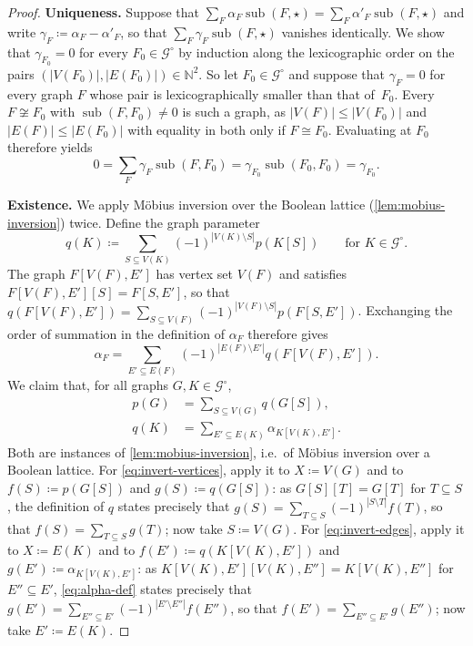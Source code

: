 \documentclass[11pt]{scrartcl}
\theoremstyle{definition}
\theoremstyle{plain}
\theoremstyle{remark}
\DeclareMathOperator{\sub}{sub}
\newcommand{\lG}{\mathcal{G}^\circ}
\begin{document}
	\begin{proof}


		\textbf{Uniqueness.}
		Suppose that $\sum_F \alpha_F \sub(F, \star) = \sum_F \alpha'_F \sub(F, \star)$
		and write $\gamma_F \coloneqq \alpha_F - \alpha'_F$,
		so that $\sum_F \gamma_F \sub(F, \star)$ vanishes identically.
		We show that $\gamma_{F_0} = 0$ for every $F_0 \in \lG$
		by induction along the lexicographic order on the pairs $(|V(F_0)|, |E(F_0)|) \in \mathbb{N}^2$.
		So let $F_0 \in \lG$ and suppose that $\gamma_F = 0$
		for every graph $F$ whose pair is lexicographically smaller than that of~$F_0$.
		Every $F \not\cong F_0$ with $\sub(F, F_0) \neq 0$ is such a graph,
		as $|V(F)| \leq |V(F_0)|$ and $|E(F)| \leq |E(F_0)|$ with equality in both only if $F \cong F_0$.
		Evaluating at $F_0$ therefore yields
		\[
			0 = \sum_F \gamma_F \sub(F, F_0) = \gamma_{F_0} \sub(F_0, F_0) = \gamma_{F_0}.
		\]
		

		\textbf{Existence.}
        We apply M\"obius inversion over the Boolean lattice (\cref{lem:mobius-inversion}) twice.
		Define the graph parameter
		\[
			q(K) \coloneqq \sum_{S \subseteq V(K)} (-1)^{|V(K) \setminus S|} p(K[S])
			\qquad \text{for } K \in \lG.
		\]
		The graph $F[V(F), E']$ has vertex set $V(F)$ and satisfies $F[V(F), E'][S] = F[S, E']$,
		so that $q(F[V(F), E']) = \sum_{S \subseteq V(F)} (-1)^{|V(F) \setminus S|} p(F[S, E'])$.
		Exchanging the order of summation in the definition of $\alpha_F$ therefore gives
		\begin{equation}\label{eq:alpha-def}
			\alpha_F = \sum_{E' \subseteq E(F)} (-1)^{|E(F) \setminus E'|} q(F[V(F), E']).
		\end{equation}
		We claim that, for all graphs $G, K \in \lG$,
		\begin{align}
			p(G) &= \sum_{S \subseteq V(G)} q(G[S]), \label{eq:invert-vertices}\\
			q(K) &= \sum_{E' \subseteq E(K)} \alpha_{K[V(K), E']}. \label{eq:invert-edges}
		\end{align}
		Both are instances of \cref{lem:mobius-inversion}, i.e.\ of Möbius inversion over a Boolean lattice.
		For \eqref{eq:invert-vertices}, apply it to $X \coloneqq V(G)$
		and to $f(S) \coloneqq p(G[S])$ and $g(S) \coloneqq q(G[S])$:
		as $G[S][T] = G[T]$ for $T \subseteq S$,
		the definition of $q$ states precisely that $g(S) = \sum_{T \subseteq S} (-1)^{|S \setminus T|} f(T)$,
		so that $f(S) = \sum_{T \subseteq S} g(T)$; now take $S \coloneqq V(G)$.
		For \eqref{eq:invert-edges}, apply it to $X \coloneqq E(K)$
		and to $f(E') \coloneqq q(K[V(K), E'])$ and $g(E') \coloneqq \alpha_{K[V(K), E']}$:
		as $K[V(K), E'][V(K), E''] = K[V(K), E'']$ for $E'' \subseteq E'$,
		\eqref{eq:alpha-def} states precisely that $g(E') = \sum_{E'' \subseteq E'} (-1)^{|E' \setminus E''|} f(E'')$,
		so that $f(E') = \sum_{E'' \subseteq E'} g(E'')$; now take $E' \coloneqq E(K)$.


\end{proof}
\end{document}
